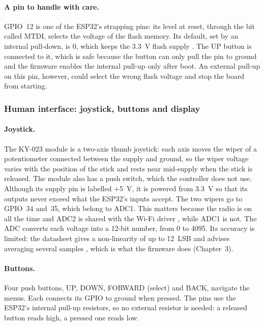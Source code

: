 \paragraph{A pin to handle with care.} GPIO~12 is one of the ESP32's strapping pins: its
level at reset, through the bit called MTDI, selects the voltage of the flash memory. Its
default, set by an internal pull-down, is 0, which keeps the 3.3~V flash supply
\cite{esp32_datasheet}. The UP button is connected to it, which is safe because the button
can only pull the pin to ground and the firmware enables the internal pull-up only after
boot. An external pull-up on this pin, however, could select the wrong flash voltage and
stop the board from starting.

\subsubsection{Human interface: joystick, buttons and display}

\paragraph{Joystick.} The KY-023 module is a two-axis thumb joystick: each axis moves the
wiper of a potentiometer connected between the supply and ground, so the wiper voltage
varies with the position of the stick and rests near mid-supply when the stick is
released. The module also has a push switch, which the controller does not use. Although
its supply pin is labelled +5~V, it is powered from 3.3~V so that its outputs never exceed
what the ESP32's inputs accept. The two wipers go to GPIO~34 and~35, which belong to ADC1.
This matters because the radio is on all the time and ADC2 is shared with the Wi-Fi
driver \cite{espidf_adc}, while ADC1 is not. The ADC converts each voltage into a 12-bit
number, from 0 to 4095. Its accuracy is limited: the datasheet gives a non-linearity of up
to 12~LSB and advises averaging several samples \cite{esp32_datasheet}, which is what the
firmware does (Chapter~3).

\paragraph{Buttons.} Four push buttons, UP, DOWN, FORWARD (select) and BACK, navigate the
menus. Each connects its GPIO to ground when pressed. The pins use the ESP32's internal
pull-up resistors, so no external resistor is needed: a released button reads high, a
pressed one reads low.

